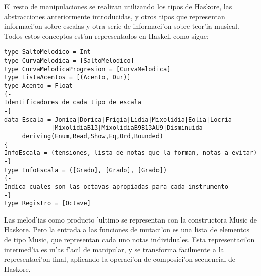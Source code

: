 ﻿\documentclass[a4paper,12pt]{article}
\begin{document}
El resto de manipulaciones se realizan utilizando los tipos de Haskore, las abstracciones anteriormente introducidas, y otros tipos que representan informaci'on sobre escalas y otra serie de informaci'on sobre teor'ia musical. Todos estos conceptos est'an representados en Haskell como sigue:
        \begin{verbatim}
type SaltoMelodico = Int
type CurvaMelodica = [SaltoMelodico]
type CurvaMelodicaProgresion = [CurvaMelodica]
type ListaAcentos = [(Acento, Dur)]
type Acento = Float 
{-
Identificadores de cada tipo de escala
-}
data Escala = Jonica|Dorica|Frigia|Lidia|Mixolidia|Eolia|Locria
             |MixolidiaB13|MixolidiaB9B13AU9|Disminuida
     deriving(Enum,Read,Show,Eq,Ord,Bounded)
{-
InfoEscala = (tensiones, lista de notas que la forman, notas a evitar)
-}
type InfoEscala = ([Grado], [Grado], [Grado])
{-
Indica cuales son las octavas apropiadas para cada instrumento
-}
type Registro = [Octave]
        \end{verbatim}

Las melod'ias como producto 'ultimo se representan con la constructora Music de Haskore. Pero la entrada a las funciones de mutaci'on es una lista de elementos de tipo Music, que representan cada uno notas individuales. Esta representaci'on intermed'ia es m'as f'acil de manipular, y se transforma facilmente a la representaci'on final, aplicando la operaci'on de composici'on secuencial de Haskore.
\end{document}
